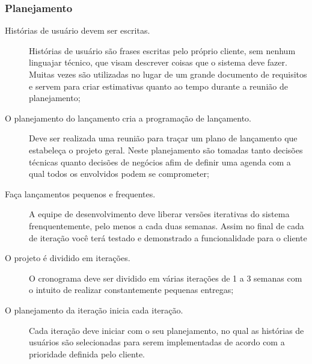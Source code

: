 \subsubsection{Planejamento}
\begin{description}
    \item[Histórias de usuário devem ser escritas.] Histórias de usuário são frases escritas
    pelo próprio cliente, sem nenhum linguajar técnico, que visam descrever coisas que o
    sistema deve fazer. Muitas vezes são utilizadas no lugar de um grande documento de
    requisitos e servem para criar estimativas quanto ao tempo durante a reunião de
    planejamento;
    \item[O planejamento do lançamento cria a programação de lançamento.] Deve ser realizada
    uma reunião para traçar um plano de lançamento que estabeleça o projeto geral. Neste
    planejamento são tomadas tanto decisões técnicas quanto decisões de negócios afim de
    definir uma agenda com a qual todos os envolvidos podem se comprometer;
    \item[Faça lançamentos pequenos e frequentes.] A equipe de desenvolvimento deve
    liberar versões iterativas do sistema frenquentemente, pelo menos a cada duas semanas.
    Assim no final de cada de iteração você terá testado e demonstrado a funcionalidade
    para o cliente
    \item[O projeto é dividido em iterações.] O cronograma deve ser dividido
    em várias iterações de 1 a 3 semanas com o intuito de realizar constantemente pequenas
    entregas;
    \item[O planejamento da iteração inicia cada iteração.] Cada iteração deve iniciar com
    o seu planejamento, no qual as histórias de usuários são selecionadas para serem
    implementadas de acordo com a prioridade definida pelo cliente.
\end{description}

